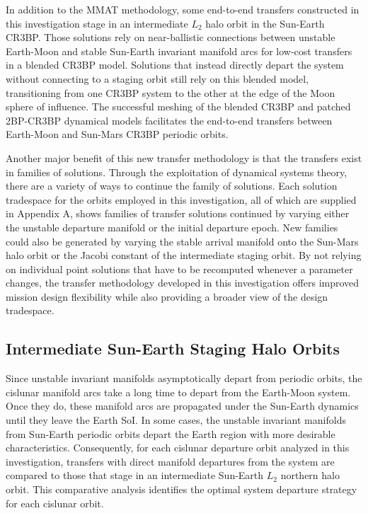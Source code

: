 In addition to the MMAT methodology, some end-to-end transfers constructed in this investigation
stage in an intermediate $L_{2}$ halo orbit in the Sun-Earth CR3BP. Those solutions rely on
near-ballistic connections between unstable Earth-Moon and stable Sun-Earth invariant manifold arcs
for low-cost transfers in a blended CR3BP model. Solutions that instead directly depart the system
without connecting to a staging orbit still rely on this blended model, transitioning from one
CR3BP system to the other at the edge of the Moon sphere of influence. The successful meshing of
the blended CR3BP and patched 2BP-CR3BP dynamical models facilitates the end-to-end transfers
between Earth-Moon and Sun-Mars CR3BP periodic orbits.

Another major benefit of this new transfer methodology is that the transfers exist in families of
solutions. Through the exploitation of dynamical systems theory, there are a variety of ways to
continue the family of solutions. Each solution tradespace for the orbits employed in this
investigation, all of which are supplied in Appendix A, shows families of transfer solutions
continued by varying either the unstable departure manifold or the initial departure epoch. New
families could also be generated by varying the stable arrival manifold onto the Sun-Mars halo
orbit or the Jacobi constant of the intermediate staging orbit. By not relying on individual point
solutions that have to be recomputed whenever a parameter changes, the transfer methodology
developed in this investigation offers improved mission design flexibility while also providing a
broader view of the design tradespace.

\subsection{Intermediate Sun-Earth Staging Halo Orbits}
Since unstable invariant manifolds asymptotically depart from periodic orbits, the cislunar
manifold arcs take a long time to depart from the Earth-Moon system. Once they do, these manifold
arcs are propagated under the Sun-Earth dynamics until they leave the Earth SoI. In some cases, the
unstable invariant manifolds from Sun-Earth periodic orbits depart the Earth region with more
desirable characteristics. Consequently, for each cislunar departure orbit analyzed in this
investigation, transfers with direct manifold departures from the system are compared to those that
stage in an intermediate Sun-Earth $L_{2}$ northern halo orbit. This comparative analysis
identifies the optimal system departure strategy for each cislunar orbit.

